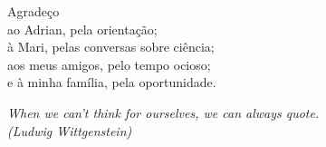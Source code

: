 \begin{agradecimentos}

  Agradeço \\
  ao Adrian, pela orientação; \\
  à Mari, pelas conversas sobre ciência; \\
  aos meus amigos, pelo tempo ocioso; \\
  e à minha família, pela oportunidade.

\end{agradecimentos}

\begin{epigrafe}
    \vspace*{\fill}
	\begin{flushright}
		\textit{
      When we can't think for ourselves, we can always quote. \\
      (Ludwig Wittgenstein)
    }
	\end{flushright}
\end{epigrafe}


